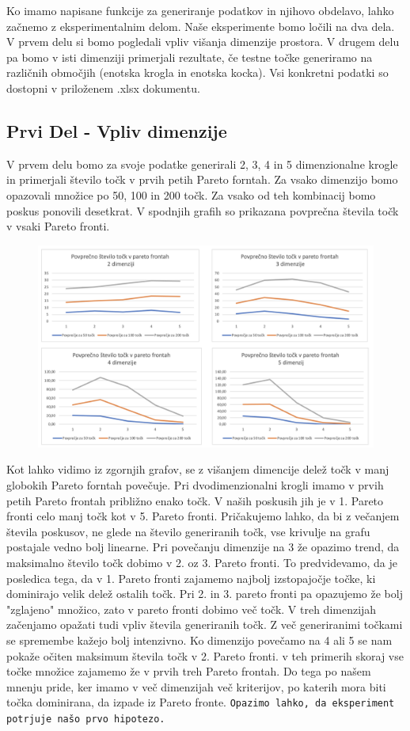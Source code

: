 \documentclass{article}
\begin{document}
Ko imamo napisane funkcije za generiranje podatkov in njihovo obdelavo, lahko začnemo z eksperimentalnim delom. Naše eksperimente bomo ločili na dva dela. V prvem delu si bomo pogledali vpliv višanja dimenzije prostora. V drugem delu pa bomo v isti dimenziji primerjali rezultate, če testne točke generiramo na različnih območjih (enotska krogla in enotska kocka). Vsi konkretni podatki so dostopni v priloženem .xlsx dokumentu.

\subsection{Prvi Del - Vpliv dimenzije}
V prvem delu bomo za svoje podatke generirali 2, 3, 4 in 5 dimenzionalne krogle in primerjali število točk v prvih petih Pareto forntah. Za vsako dimenzijo bomo opazovali množice po 50, 100 in 200 točk. Za vsako od teh kombinacij bomo poskus ponovili desetkrat. V spodnjih grafih so prikazana povprečna števila točk v vsaki Pareto fronti.

\break
\begin{figure}[htbp]
    \includegraphics[width=130mm]{Slike/Graf1.png}
\centering
\end{figure}

Kot lahko vidimo iz zgornjih grafov, se z višanjem dimencije delež točk v manj globokih Pareto forntah povečuje. Pri dvodimenzionalni krogli imamo v prvih petih Pareto frontah približno enako točk. V naših poskusih jih je v 1. Pareto fronti celo manj točk kot v 5. Pareto fronti. Pričakujemo lahko, da bi z večanjem števila poskusov, ne glede na število generiranih točk, vse krivulje na grafu postajale vedno bolj linearne. Pri povečanju dimenzije na 3 že opazimo trend, da maksimalno število točk dobimo v 2. oz 3. Pareto fronti. To predvidevamo, da je posledica tega, da v 1. Pareto fronti zajamemo najbolj izstopajočje točke, ki dominirajo velik delež ostalih točk. Pri 2. in 3. pareto fronti pa opazujemo že bolj "zglajeno" množico, zato v pareto fronti dobimo več točk. V treh dimenzijah začenjamo opažati tudi vpliv števila generiranih točk. Z več generiranimi točkami se spremembe kažejo bolj intenzivno. Ko dimenzijo povečamo na 4 ali 5 se nam pokaže očiten maksimum števila točk v 2. Pareto fronti. v teh primerih skoraj vse točke množice zajamemo že v prvih treh Pareto frontah. Do tega po našem mnenju pride, ker imamo v več dimenzijah več kriterijov, po katerih mora biti točka dominirana, da izpade iz Pareto fronte. \break
\texttt{Opazimo lahko, da eksperiment potrjuje našo prvo hipotezo.}
\end{document}
